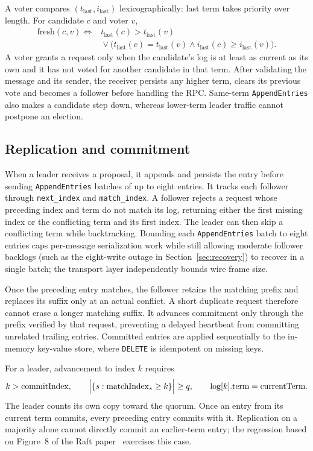 \documentclass[10pt,a4paper]{article}
\newcommand{\rpc}[1]{\mbox{\texttt{#1}}}
\begin{document}
A voter compares $(t_{\mathrm{last}}, i_{\mathrm{last}})$ lexicographically:
last term takes priority over length. For candidate $c$ and voter $v$,
\begin{equation}
\begin{aligned}
\mathrm{fresh}(c, v) \iff{}& t_{\mathrm{last}}(c) > t_{\mathrm{last}}(v)\\
&{}\lor\bigl(t_{\mathrm{last}}(c) = t_{\mathrm{last}}(v)
\land i_{\mathrm{last}}(c) \geq i_{\mathrm{last}}(v)\bigr).
\end{aligned}
\end{equation}
A voter grants a request only when the candidate's log is at least as current
as its own and it has not voted for another candidate in that term. After
validating the message and its sender, the receiver persists any higher term,
clears its previous vote and becomes a follower before handling the RPC.
Same-term \rpc{AppendEntries} also makes a candidate step down, whereas lower-term
leader traffic cannot postpone an election.

\subsection{Replication and commitment}
When a leader receives a proposal, it appends and persists the entry before
sending \rpc{AppendEntries} batches of up to eight entries. It tracks each follower
through \texttt{next\_index} and \texttt{match\_index}. A follower rejects a
request whose preceding index and term do not match its log, returning either
the first missing index or the conflicting term and its first index. The leader
can then skip a conflicting term while backtracking. Bounding each
\rpc{AppendEntries} batch to eight entries caps per-message serialization work
while still allowing moderate follower backlogs (such as the eight-write outage
in Section~\ref{sec:recovery}) to recover in a single batch; the transport
layer independently bounds wire frame size.

Once the preceding entry matches, the follower retains the matching prefix and
replaces its suffix only at an actual conflict. A short duplicate request
therefore cannot erase a longer matching suffix. It advances commitment only
through the prefix verified by that request, preventing a delayed heartbeat from
committing unrelated trailing entries. Committed entries are applied sequentially
to the in-memory key-value store, where \texttt{DELETE} is idempotent on missing keys.

For a leader, advancement to index $k$ requires
\[
k > \mathrm{commitIndex},\qquad
\Bigl\lvert\{s : \mathrm{matchIndex}_s \geq k\}\Bigr\rvert \geq q,\qquad
\mathrm{log}[k].\mathrm{term} = \mathrm{currentTerm}.
\]
The leader counts its own copy toward the quorum. Once an entry from its current
term commits, every preceding entry commits with it. Replication on a majority
alone cannot directly commit an earlier-term entry; the regression based on
Figure~8 of the Raft paper~\cite{raft} exercises this case.
\end{document}
